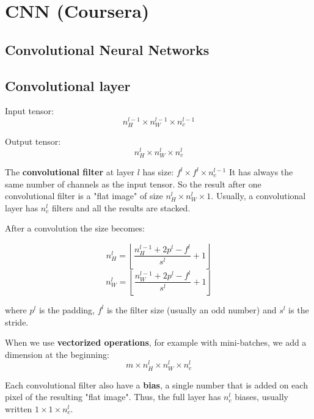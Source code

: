 
\chapter{CNN (Coursera)}


\section{Convolutional Neural Networks}
\section{Convolutional layer}


Input tensor:
\begin{equation}
    n_H^{l-1} \times n_W^{l-1} \times n_c^{l-1}
\end{equation}

Output tensor:
\begin{equation}
    n_H^l \times n_W^l \times n_c^l
\end{equation}

The \textbf{convolutional filter} at layer $l$ has size: $f^l \times f^l \times n_c^{l-1}$ It has always the same number of channels as the input tensor. So the result after one convolutional filter is a "flat image" of size $n_H^l \times n_W^l \times 1$. Usually, a convolutional layer has $n_c^l$ filters and all the results are stacked.

After a convolution the size becomes:

\begin{equation}
    n_H^l = \left\lfloor \frac{n_H^{l-1} + 2 p^l - f^l}{s^l} + 1 \right\rfloor
\end{equation}
\begin{equation}
    n_W^l = \left\lfloor \frac{n_W^{l-1} + 2 p^l - f^l}{s^l} + 1 \right\rfloor
\end{equation}

where $p^l$ is the padding, $f^l$ is the filter size (usually an odd number) and $s^l$ is the stride.


When we use \textbf{vectorized operations}, for example with mini-batches, we add a dimension at the beginning:
\begin{equation}
    m \times n_H^l \times n_W^l \times n_c^l
\end{equation}


Each convolutional filter also have a \textbf{bias}, a single number that is added on each pixel of the resulting "flat image". Thus, the full layer has $n_c^l$ biases, usually written $1 \times 1 \times n_c^l$.

